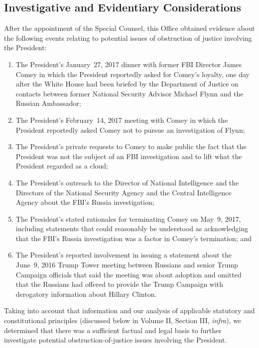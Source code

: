 \subsection{Investigative and Evidentiary Considerations}

After the appointment of the Special Counsel, this Office obtained evidence about the following events relating to potential issues of obstruction of justice involving the President:

\renewcommand{\labelenumi}{(\alph{enumi})}
\begin{enumerate}
    \item The President’s January~27, 2017 dinner with former FBI Director James Comey in which the President reportedly asked for Comey’s loyalty, one day after the White House had been briefed by the Department of Justice on contacts between former National Security Advisor Michael Flynn and the Russian Ambassador;

    \item The President’s February~14, 2017 meeting with Comey in which the President reportedly asked Comey not to pursue an investigation of Flynn;

    \item The President’s private requests to Comey to make public the fact that the President was not the subject of an FBI investigation and to lift what the President regarded as a cloud;

    \item The President’s outreach to the Director of National Intelligence and the Directors of the National Security Agency and the Central Intelligence Agency about the FBI’s Russia investigation;

    \item The President’s stated rationales for terminating Comey on May~9, 2017, including statements that could reasonably be understood as acknowledging that the FBI’s Russia investigation was a factor in Comey’s termination; and

    \item The President’s reported involvement in issuing a statement about the June~9, 2016 Trump Tower meeting between Russians and senior Trump Campaign officials that said the meeting was about adoption and omitted that the Russians had offered to provide the Trump Campaign with derogatory information about Hillary Clinton.
\end{enumerate}

Taking into account that information and our analysis of applicable statutory and constitutional principles (discussed below in Volume II, Section III, \textit{infra}), we determined that there was a sufficient factual and legal basis to further investigate potential obstruction-of-justice issues involving the President.

